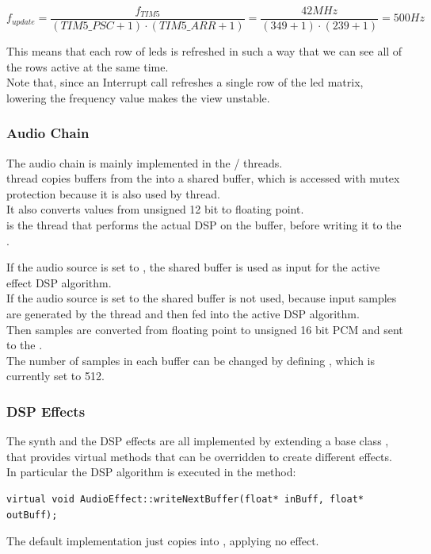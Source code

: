 $$f_{update} = \frac{f_{TIM5}}{(TIM5\_PSC+1)\cdot(TIM5\_ARR+1)} = \frac{42MHz}{(349+1)\cdot(239+1)} = 500Hz$$

This means that each row of leds is refreshed in such a way that we can see all of the rows active at the same time.\\
Note that, since an Interrupt call refreshes a single row of the led matrix, lowering the frequency value makes the view unstable.\par



\subsubsection{Audio Chain}
The audio chain is mainly implemented in the / threads.\\
 thread copies buffers from the  into a shared buffer, which is accessed with mutex protection because it is also used by  thread.\\ It also converts values from unsigned 12 bit to floating point.\\
 is the thread that performs the actual DSP on the buffer, before writing it to the .\par

If the audio source is set to , the shared buffer is used as input for the active effect DSP algorithm.\\
If the audio source is set to  the shared buffer is not used, because input samples are generated by the thread and then fed into the active DSP algorithm.\\
Then samples are converted from floating point to unsigned 16 bit PCM and sent to the .\\
The number of samples in each buffer can be changed by defining , which is currently set to 512.

\subsubsection{DSP Effects}

The synth and the DSP effects are all implemented by extending a base class , that provides virtual methods that can be overridden to create different effects.\\ 
In particular the DSP algorithm is executed in the method:\\
\begin{lstlisting}
virtual void AudioEffect::writeNextBuffer(float* inBuff, float* outBuff);
\end{lstlisting}
The default implementation just copies  into , applying no effect.\par

